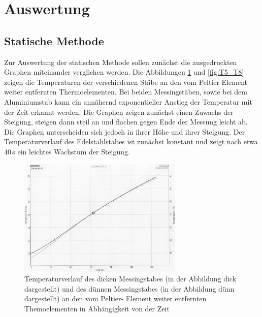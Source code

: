 \section{Auswertung}
\label{sec:Auswertung}

\subsection{Statische Methode}
\label{sec:auswertung_statisch}

Zur Auswertung der statischen Methode sollen zunächst die ausgedruckten Graphen
miteinander verglichen werden. Die Abbildungen \ref{fig:T1_T4} und \ref{fig:T5_T8} zeigen
die Temperaturen der verschiedenen Stäbe an den vom Peltier-Element weiter entfernten
Thermoelementen. Bei beiden Messingstäben, sowie bei dem Aluminiumstab kann ein annähernd
exponentieller Anstieg der Temperatur mit der Zeit erkannt werden. Die Graphen
zeigen zunächst einen Zuwachs der Steigung, steigen dann  steil an und flachen
gegen Ende der Messung leicht ab. Die Graphen unterscheiden sich jedoch in ihrer
Höhe und ihrer Steigung. Der Temperaturverlauf des Edelstahlstabes ist zunächst
konstant und zeigt nach etwa $40$\,s ein leichtes Wachstum der Steigung.

\begin{figure}
  \centering
  \includegraphics[width=0.7\textwidth]{data/t1undt4.JPEG}
  \caption{Temperaturverlauf des dicken Messingstabes (in der Abbildung dick dargestellt)
  und des dünnen Messingstabes (in der Abbildung dünn dargestellt) an den vom Peltier-
  Element weiter entfernten Themoelementen in Abhängigkeit von der Zeit}
  \label{fig:T1_T4}
\end{figure}

